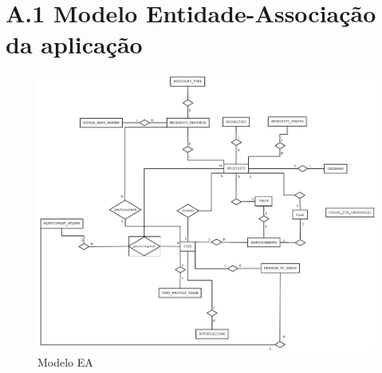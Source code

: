 \documentclass[a4paper,openright,11pt]{report}
\begin{document}
\chapter*{A.1 Modelo Entidade-Associação da aplicação}
\begin{figure}[H]
  \centering 
  \includegraphics[angle=-90,origin=c, scale=0.6]{figures/ModeloEA.png}
  \caption{Modelo EA}\label{anexo:modeloEA}
\end{figure}
\end{document}
